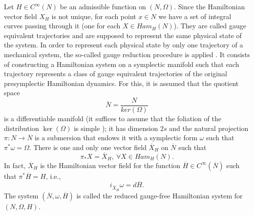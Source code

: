 \documentclass[10pt,a4paper]{article}
\begin{document}
Let $H\in C^{\infty}(N)$ be an admissible function on $(N,\Omega)$. Since the Hamiltonian vector field $X_{H}$ is not unique, for each point $x\in N$ we have a set of integral curves passing through it (one for each $X\in Ham_{H}(N)$). They are called gauge equivalent trajectories and are supposed to represent the same physical state of the system. In order to represent each physical state by only one trajectory of a mechanical system, the so-called gauge reduction procedure is applied \cite{echeverria1999reduction}. It consists of constructing a Hamiltonian system on a symplectic manifold such that each trajectory represents a class of gauge equivalent trajectories of the original presymplectic Hamiltonian dynamics. For this, it is assumed that the quotient space
\begin{equation*}
\overline{N}=\frac{N}{ker(\Omega)}
\end{equation*}
is a differentiable manifold (it suffices to assume that the foliation of the distribution $\ker(\Omega)$ is simple \cite{libermann2012symplectic,grabowska2023reductions}); it has dimension $2s$ and the natural projection $\pi:N\longrightarrow\overline{N}$ is a submersion that endows it with a symplectic form $\omega$ such that $\pi^{*}\omega=\Omega$. There is one and only one vector field $\overline{X}_{H}$ on $\overline{N}$ such that 
\begin{equation*}
\pi_{*}X=\overline{X}_{H}, \ \forall X\in Ham_{H}(N).
\end{equation*}
In fact, $\overline{X}_{H}$ is the Hamiltonian vector field for the function $\overline{H}\in C^{\infty}(\overline{N})$ such that $\pi^{*}\overline{H}=H$, i.e.,
\begin{equation*}
i_{\overline{X}_{H}}\omega=d\overline{H}.
\end{equation*}
The system $(\overline{N},\omega,\overline{H})$ is called the reduced gauge-free Hamiltonian system for $(N,\Omega,H)$.
\end{document}
